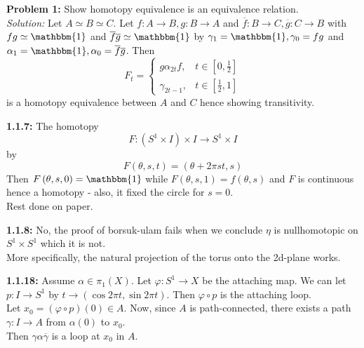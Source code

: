 \documentclass[a4paper]{article}
\begin{document}
    

\textbf{Problem 1:} Show homotopy equivalence is an equivalence relation.\\
\linebreak
\textit{Solution:}
Let $A \simeq B \simeq C$. Let $f  \colon A \to B, g  \colon B\to A$ and
$\overline{f}  \colon B \to C, \overline{g}  \colon C \to B$ with
$fg \simeq \mathbbm{1}$ and $\overline{f}\overline{g} \simeq \mathbbm{1}$ by
$\gamma_1 = \mathbbm{1}, \gamma_0 = fg$ and $\alpha_1 = \mathbbm{1}, \alpha_0 =
\overline{f}\overline{g}$. Then
\[
F_t = \begin{cases}
    g \alpha_{2t} f,& t \in \left[ 0, \frac{1}{2} \right]\\
    \gamma_{2t -1},& t \in \left[ \frac{1}{2},1 \right] 
\end{cases}
\] 
is a homotopy equivalence between $A$ and $C$ hence showing transitivity.\\
\linebreak







\textbf{1.1.7:} The homotopy
\[
F  \colon \left( S^{1} \times  I \right) \times I \to S^{1} \times I
\] 
by
\[
F \left( \theta , s, t \right) =  \left( \theta + 2 \pi s t, s \right) 
\] 
Then $F\left( \theta , s , 0 \right) = \mathbbm{1}$ while
$F\left( \theta, s , 1 \right) = f\left( \theta , s \right) $ and
$F$ is continuous hence a homotopy - also, it fixed the circle for $s=0$.\\
\linebreak
Rest done on paper.\\
\linebreak

\textbf{1.1.8:} No, the proof of borsuk-ulam fails
when we conclude $\eta$ is nullhomotopic on $S^{1} \times S^{1}$ which it is
not.\\
More specifically, the natural projection of the torus onto the
2d-plane works.





\textbf{1.1.18:} Assume $\alpha \in \pi_1 \left( X \right) $.
Let $\varphi  \colon S^{1} \to X$ be the attaching map.
We can let $p  \colon I \to S^{1}$ by $t \to \left( \cos 2\pi t, \sin
2 \pi t\right) $. Then $\varphi \circ p$ is the attaching loop.\\
Let $x_0 = \left( \varphi \circ p \right) (0) \in A$.
Now, since $A$ is path-connected, there exists
a path $\gamma  \colon I \to A$ from $\alpha (0)$ to $x_0$.\\
Then $\gamma \alpha \overline{\gamma}$ is a loop
at $x_0$ in $A$.\\
\linebreak
\end{document}

